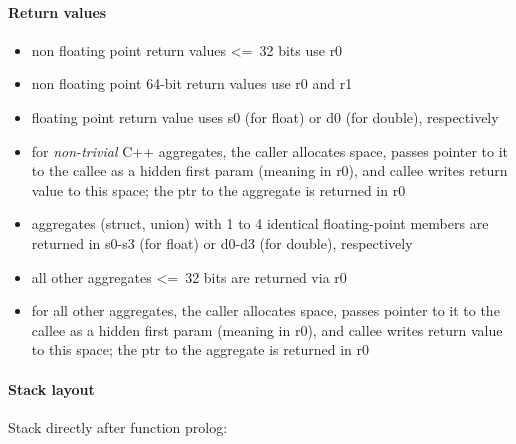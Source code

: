 \paragraph{Return values}

\begin{itemize}
\item non floating point return values \textless=\ 32 bits use r0
\item non floating point 64-bit return values use r0 and r1
\item floating point return value uses s0 (for float) or d0 (for double), respectively
\item for {\it non-trivial} C++ aggregates, the caller allocates space, passes pointer to it to the callee as a hidden first param
(meaning in r0), and callee writes return value to this space; the ptr to the aggregate is returned in r0
\item aggregates (struct, union) with 1 to 4 identical floating-point members are returned in s0-s3 (for float) or d0-d3 (for double), respectively
\item all other aggregates \textless=\ 32 bits are returned via r0
\item for all other aggregates, the caller allocates space, passes pointer to it to the callee as a hidden first param
(meaning in r0), and callee writes return value to this space; the ptr to the aggregate is returned in r0
\end{itemize}

\paragraph{Stack layout}

Stack directly after function prolog:\\

